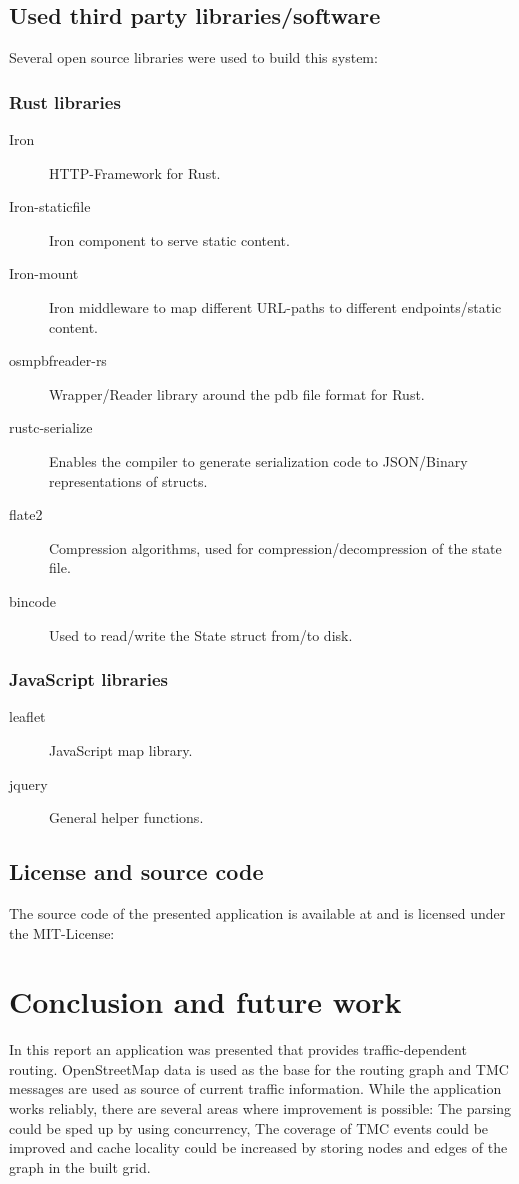 \documentclass[a4paper]{scrartcl}
\begin{document}
\subsection{Used third party libraries/software}
Several open source libraries were used to build this system:

\subsubsection{Rust libraries}
\begin{description}
\item[Iron]\cite{iron} HTTP-Framework for Rust.
\item[Iron-staticfile]\cite{iron_staticfile} Iron component to serve static content.
\item[Iron-mount]\cite{iron_mount} Iron middleware to map different URL-paths to different endpoints/static content.
\item[osmpbfreader-rs]\cite{osmpbfreader} Wrapper/Reader library around the pdb file format for Rust.
\item[rustc-serialize]\cite{rustc-serialize} Enables the compiler to generate serialization code to JSON/Binary representations of structs.
\item[flate2]\cite{flate2} Compression algorithms, used for compression/decompression of the state file.
\item[bincode]\cite{bincode} Used to read/write the State struct from/to disk.
\end{description}

\subsubsection{JavaScript libraries}
\begin{description}
\item[leaflet]\cite{leaflet} JavaScript map library.
\item[jquery] \cite{jquery} General helper functions.
\end{description}

\subsection{License and source code}
The source code of the presented application is available at \cite{github} and is licensed under the MIT-License:


\section{Conclusion and future work}
\label{concl}
In this report an application was presented that provides traffic-dependent routing. OpenStreetMap data is used as the base for the routing graph and TMC messages are used as source of current traffic information. While the application works reliably, there are several areas where improvement is possible: The parsing could be sped up by using concurrency, The coverage of TMC events could be improved and cache locality could be increased by storing nodes and edges of the graph in the built grid. 
\end{document}

